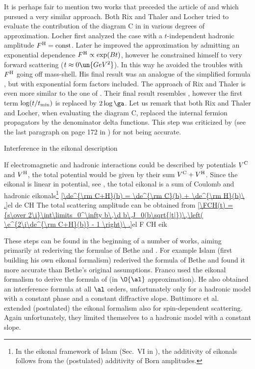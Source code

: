 It is perhaps fair to mention two works that preceded the article of \WaY{}  and which pursued a very similar approach. Both Rix and Thaler  and Locher  tried to evaluate the contribution of the diagram C in  in various degrees of approximation. Locher first analyzed the case with a $t$-independent hadronic amplitude $F^{\rm H}=\hbox{const}$. Later he improved the approximation by admitting an exponential dependence $F^{\rm H} \propto \exp(Bt)$, however he constrained himself to very forward scattering ($t\approx 0\un{GeV^2}$). In this way he avoided the troubles with $F^{\rm H}$ going off mass-shell. His final result was an analogue of the simplified \WaY{} formula , but with exponential form factors included. The approach of Rix and Thaler is even more similar to the one of \WaY. Their final result resembles , however the first term $\log(t/t_{\rm min})$ is replaced by $2\log\ga$. Let us remark that both Rix and Thaler and Locher, when evaluating the diagram C, replaced the internal fermion propagators by the denominator delta functions. This step was criticized by \WaY{} (see the last paragraph on page 172 in ) for not being accurate.



\caption{Interference in the eikonal description}

If electromagnetic and hadronic interactions could be described by potentials $V^{\rm C}$ and $V^{\rm H}$, the total potential would be given by their sum $V^{\rm C} + V^{\rm H}$. Since the eikonal is linear in potential, see , the total eikonal is a sum of Coulomb and hadronic eikonals\footnote{%
In the eikonal framework of Islam (Sec.~VI in ), the additivity of eikonals follows from the (postulated) additivity of Born amplitudes.
}
\eqref{\de^{\rm C+H}(b) = \de^{\rm C}(b) + \de^{\rm H}(b)\ .}{el de CH}
The total scattering amplitude can be obtained from 
\eqref{\FCH(t) = {s\over 2\i}\int\limits_0^\infty b\,\d b\,J_0(b\sqrt{|t|})\,\left( \e^{2\i\de^{\rm C+H}(b)} - 1 \right)\ .}{el F CH eik}

These steps can be found in the beginning of a number of works, aiming primarily at rederiving the formulae of Bethe  and \WY{} .
  For example Islam  (first building his own eikonal formalism) rederived the formula of Bethe and found it more accurate than Bethe's original assumptions.
  Franco  used the eikonal formalism to derive the formula of \WY{} (in $\O{\al}$ approximation). He also obtained an interference formula at all $\al$ orders, unfortunately only for a hadronic model with a constant phase and a constant diffractive slope.
  Buttimore et al.~ extended (postulated) the eikonal formalism also for spin-dependent scattering. Again unfortunately, they limited themselves to a hadronic model with a constant slope.

